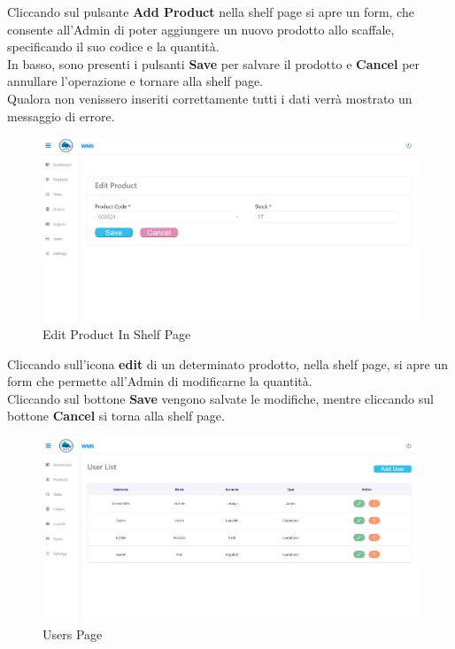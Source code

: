 Cliccando sul pulsante \textbf{Add Product} nella shelf page si apre un form, che consente
all'Admin di poter aggiungere un nuovo prodotto allo scaffale, specificando il suo codice e la quantità.\\
In basso, sono presenti i pulsanti \textbf{Save} per salvare il prodotto e \textbf{Cancel} per annullare l'operazione
e tornare alla shelf page.\\
Qualora non venissero inseriti correttamente tutti i dati verrà mostrato un messaggio di errore.

\begin{figure}[H]
    \centering
    \includegraphics[width=\textwidth]{document/sections/img/Storyboard/editProductInShelf.png}
    \caption{Edit Product In Shelf Page}
    \label{fig:editProductInShelfPage}
\end{figure}

Cliccando sull'icona \textbf{edit} di un determinato prodotto, nella shelf page, si apre un form
che permette all'Admin di modificarne la quantità.\\
Cliccando sul bottone \textbf{Save} vengono salvate le modifiche, mentre cliccando sul bottone \textbf{Cancel} si torna alla shelf page.

\begin{figure}[H]
    \centering
    \includegraphics[width=\textwidth]{document/sections/img/Storyboard/usersPage.png}
    \caption{Users Page}
    \label{fig:viewUsersPage}
\end{figure}

